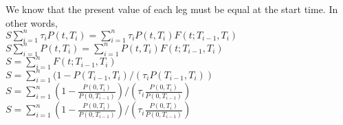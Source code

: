 \documentclass{article}
\begin{document}
{We know that the present value of each leg must be equal at the start time. In other words, \\
$S\sum_{i=1}^{n} \tau_i P(t, T_i) = \sum_{i=1}^{n} \tau_i P(t, T_i)F(t; T_{i-1}, T_i)$ \\ 
$S\sum_{i=1}^{n} P(t, T_i) = \sum_{i=1}^{n} P(t, T_i)F(t; T_{i-1}, T_i)$ \\ 
$S = \sum_{i=1}^{n} F(t; T_{i-1}, T_i)$ \\ 
$S = \sum_{i=1}^{n} (1 - P(T_{i-1}, T_i) / (\tau_iP(T_{i-1}, T_i))$ \\ 
$S = \sum_{i=1}^{n} (1 - \frac{P(0, T_i)}{P(0, T_{i-1})}) / (\tau_i \frac{P(0, T_i)}{P(0, T_{i-1})})$ \\ 
$S = \sum_{i=1}^{n} (1 - \frac{P(0, T_i)}{P(0, T_{i-1})}) / (\tau_i \frac{P(0, T_i)}{P(0, T_{i-1})})$ \\ 

}
\end{document}
